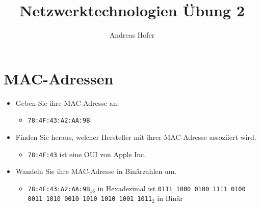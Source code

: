 \documentclass{article}
\title{Netzwerktechnologien Übung 2}
\author{Andreas Hofer}
\begin{document}
	\maketitle
	\section{MAC-Adressen}
	\begin{itemize}
		\item{Geben Sie ihre MAC-Adresse an:}
		\begin{itemize}
			\item{\verb|78:4F:43:A2:AA:9B|}
		\end{itemize}
		\item{Finden Sie heraus, welcher Hersteller mit ihrer MAC-Adresse assoziiert wird.}
		\begin{itemize}
			\item{\verb|78:4F:43|  ist eine OUI von Apple Inc.}
		\end{itemize}
		\item{Wandeln Sie ihre MAC-Adresse in Binärzahlen um.}
		\begin{itemize}
			\item{\verb|78:4F:43:A2:AA:9B|$_{16}$ in Hexadezimal ist \verb|0111 1000 0100 1111 0100 0011 1010 0010 1010 1010 1001 1011|$_2$ in Binär}
		\end{itemize}
	\end{itemize}
\end{document}
